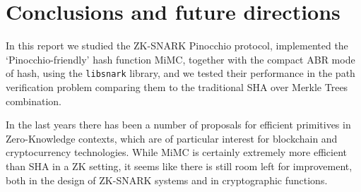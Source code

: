 \section{Conclusions and future directions}\label{sec:conclusions}
In this report we studied the ZK-SNARK Pinocchio protocol, implemented the `Pinocchio-friendly'
hash function MiMC, together with the compact ABR mode of hash, using the \texttt{libsnark} library,
and we tested their performance in the path verification problem comparing them to the traditional
SHA over Merkle Trees combination.

In the last years there has been a number of proposals for efficient primitives in Zero-Knowledge
contexts, which are of particular interest for blockchain and cryptocurrency technologies.
While MiMC is certainly extremely more efficient than SHA in a ZK setting, it seems like there is
still room left for improvement, both in the design of ZK-SNARK systems and in cryptographic
functions.
